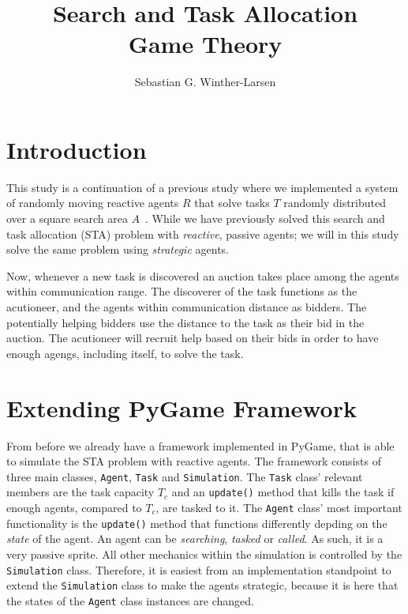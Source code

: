 \documentclass[11pt]{article}
\title{Search and Task Allocation \\
    \small{Game Theory}}
\author{Sebastian G. Winther-Larsen}
\begin{document}
    \maketitle

    \section{Introduction}
        This study is a continuation of a previous study where we 
        implemented a system of randomly moving reactive agents
        $R$ that solve tasks $T$ randomly distributed over 
        a square search area $A$~\cite{greg2020mas}. While we have 
        previously solved this search and task allocation (STA) problem
        with \emph{reactive}, passive agents; we will in this study solve the 
        same problem using \emph{strategic} agents.

        Now, whenever a new task is discovered an auction takes place among the 
        agents within communication range. The discoverer of the task functions 
        as the acutioneer, and the agents within communication distance as
        bidders. The potentially helping bidders use the distance to the 
        task as their bid in the auction. The acutioneer will recruit help 
        based on their bids in order to have enough agengs, including itself,
        to solve the task.

    \section{Extending PyGame Framework}

        From before we already have a framework implemented in PyGame\cite{pygame},
        that is able to simulate the STA problem with reactive agents. The 
        framework consists of three main classes, \lstinline|Agent|, \lstinline|Task|
        and \lstinline|Simulation|. The \lstinline|Task| class' relevant members
        are the task capacity $T_c$ and an \lstinline|update()| method that kills the 
        task if enough agents, compared to $T_c$, are tasked to it. The \lstinline|Agent|
        class' most important functionality is the \lstinline|update()| method that 
        functions differently depding on the \emph{state} of the agent. An agent can be 
        \emph{searching}, \emph{tasked} or \emph{called}. As such, it is a very passive 
        sprite. All other mechanics within the simulation is controlled by the 
        \lstinline|Simulation| class. Therefore, it is easiest from an implementation 
        standpoint to extend the \lstinline|Simulation| class to make the 
        agents strategic, because it is here that the states of the \lstinline|Agent| 
        class instances are changed.
\end{document}
